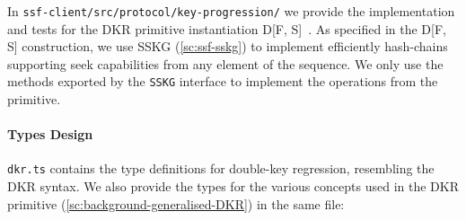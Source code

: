 In \texttt{ssf-client/src/protocol/key-progression/} we provide
the implementation and tests for the DKR primitive instantiation
D[F, S]~\cite{GKP}. As specified in the D[F, S] construction, we use
SSKG (\cref{sc:ssf-sskg}) to implement efficiently hash-chains supporting seek capabilities from any element of the sequence. 
We only use the methods exported by the
\texttt{SSKG} interface to implement the operations from the primitive. 

\paragraph{Types Design}
\texttt{dkr.ts} contains the 
type definitions for double-key regression, resembling
the DKR syntax. We also provide the types for the various
concepts used in the DKR primitive (\cref{sc:background-generalised-DKR}) in the same file:
